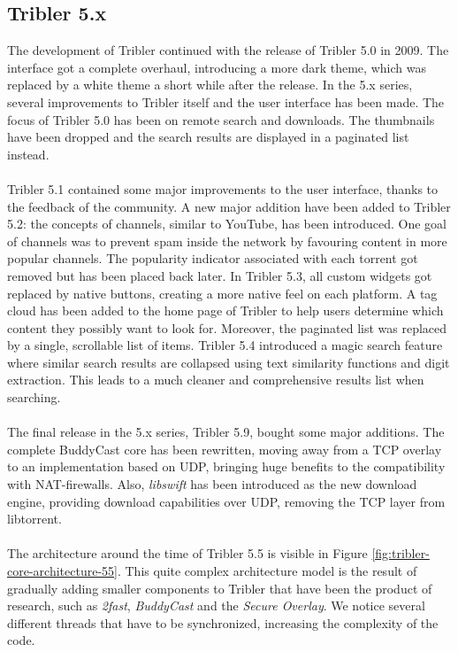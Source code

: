 \subsection{Tribler 5.x}
The development of Tribler continued with the release of Tribler 5.0 in 2009\cite{historyoftribler}. The interface got a complete overhaul, introducing a more dark theme, which was replaced by a white theme a short while after the release. In the 5.x series, several improvements to Tribler itself and the user interface has been made. The focus of Tribler 5.0 has been on remote search and downloads. The thumbnails have been dropped and the search results are displayed in a paginated list instead.\\\\
Tribler 5.1 contained some major improvements to the user interface, thanks to the feedback of the community. A new major addition have been added to Tribler 5.2: the concepts of channels, similar to YouTube, has been introduced. One goal of channels was to prevent spam inside the network by favouring content in more popular channels. The popularity indicator associated with each torrent got removed but has been placed back later. In Tribler 5.3, all custom widgets got replaced by native buttons, creating a more native feel on each platform. A tag cloud has been added to the home page of Tribler to help users determine which content they possibly want to look for. Moreover, the paginated list was replaced by a single, scrollable list of items. Tribler 5.4 introduced a magic search feature where similar search results are collapsed using text similarity functions and digit extraction. This leads to a much cleaner and comprehensive results list when searching.\\\\
The final release in the 5.x series, Tribler 5.9, bought some major additions. The complete BuddyCast core has been rewritten, moving away from a TCP overlay to an implementation based on UDP, bringing huge benefits to the compatibility with NAT-firewalls. Also, \emph{libswift} has been introduced as the new download engine, providing download capabilities over UDP, removing the TCP layer from libtorrent.\\\\
The architecture around the time of Tribler 5.5 is visible in Figure \ref{fig:tribler-core-architecture-55}. This quite complex architecture model is the result of gradually adding smaller components to Tribler that have been the product of research, such as \emph{2fast}, \emph{BuddyCast} and the \emph{Secure Overlay}. We notice several different threads that have to be synchronized, increasing the complexity of the code.

